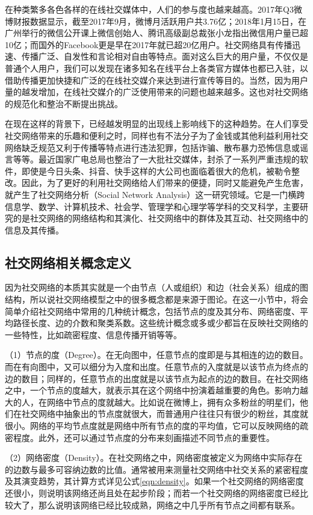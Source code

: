 在种类繁多各色各样的在线社交媒体中，人们的参与度也越来越高。2017年Q3微博财报数据显示，截至2017年9月，微博月活跃用户共3.76亿；2018年1月15日，在广州举行的微信公开课上微信创始人、腾讯高级副总裁张小龙指出微信用户量已超10亿；而国外的Facebook更是早在2017年就已超20亿用户。社交网络具有传播迅速、传播广泛、自发性和言论相对自由等特点。面对这么巨大的用户量，不仅仅是普通个人用户，我们可以发现在诸多知名在线平台上各类官方媒体也都已入驻，以借助传播更加快捷和广泛的在线社交媒介来达到进行宣传等目的。当然，因为用户量的越发增加，在线社交媒介的广泛使用带来的问题也越来越多。这也对社交网络的规范化和整治不断提出挑战。

在现在这样的背景下，已经越发明显的出现线上影响线下的这种趋势。在人们享受社交网络带来的乐趣和便利之时，同样也有不法分子为了金钱或其他利益利用社交网络缺乏规范又利于传播等特点进行违法犯罪，包括诈骗、散布暴力恐怖信息或谣言等等。最近国家广电总局也整治了一大批社交媒体，封杀了一系列严重违规的软件，即使是今日头条、抖音、快手这样的大公司也面临着很大的危机，被勒令整改。因此，为了更好的利用社交网络给人们带来的便捷，同时又能避免产生危害，就产生了社交网络分析（Social Network Analysis）这一研究领域。它是一门横跨信息学、数学、计算机技术、社会学、管理学和心理学等学科的交叉科学，主要研究的是社交网络的网络结构和其演化、社交网络中的群体及其互动、社交网络中的信息及其传播。

\subsection{社交网络相关概念定义}

因为社交网络的本质其实就是一个由节点（人或组织）和边（社会关系）组成的图结构，所以说社交网络模型之中的很多概念都是来源于图论。在这一小节中，将会简单介绍社交网络中常用的几种统计概念，包括节点的度及其分布、网络密度、平均路径长度、边的介数和聚类系数。这些统计概念或多或少都旨在反映社交网络的一些特性，比如疏密程度、信息传播开销等等。

（1）节点的度（Degree）。在无向图中，任意节点的度即是与其相连的边的数目。而在有向图中，又可以细分为入度和出度。任意节点的入度就是以该节点为终点的边的数目；同样的，任意节点的出度就是以该节点为起点的边的数目。在社交网络之中，一个节点的度越大，就表示其在这个网络中扮演着越重要的角色。影响力越大的人，在网络中节点的度就越大。比如说在微博上，拥有众多粉丝的明星们，他们在社交网络中抽象出的节点度就很大，而普通用户往往只有很少的粉丝，其度就很小。网络的平均节点度就是网络中所有节点的度的平均值，它可以反映网络的疏密程度。此外，还可以通过节点度的分布来刻画描述不同节点的重要性。

（2）网络密度（Density）。在社交网络之中，网络密度被定义为网络中实际存在的边数与最多可容纳边数的比值。通常被用来测量社交网络中社交关系的紧密程度及其演变趋势，其计算方式详见公式\ref{eqn:density}。如果一个社交网络的网络密度还很小，则说明该网络还尚且处在起步阶段；而若一个社交网络的网络密度已经比较大了，那么说明该网络已经比较成熟，网络之中几乎所有节点之间都有联系。

